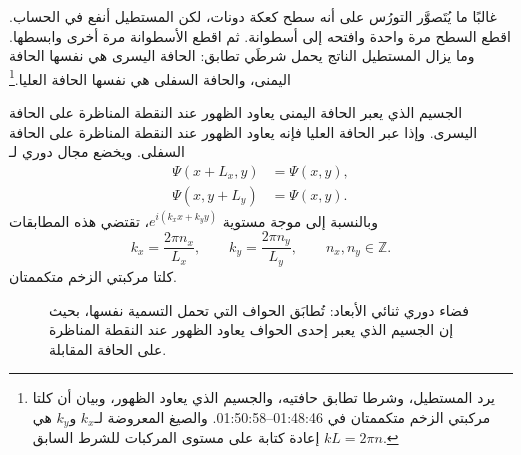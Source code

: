 \begin{classroomqa}
\end{classroomqa}

غالبًا ما يُتَصوَّر التورُس على أنه سطح كعكة دونات، لكن المستطيل أنفع في الحساب. اقطع السطح مرة واحدة وافتحه إلى أسطوانة. ثم اقطع الأسطوانة مرة أخرى وابسطها. وما يزال المستطيل الناتج يحمل شرطَي تطابق: الحافة اليسرى هي نفسها الحافة اليمنى، والحافة السفلى هي نفسها الحافة العليا.\footnote{يرد المستطيل، وشرطا تطابق حافتيه، والجسيم الذي يعاود الظهور، وبيان أن كلتا مركبتي الزخم متكممتان في 01:48:46--01:50:58. والصيغ المعروضة لـ\(k_x\) و\(k_y\) هي إعادة كتابة على مستوى المركبات للشرط السابق \(kL=2\pi n\).}

الجسيم الذي يعبر الحافة اليمنى يعاود الظهور عند النقطة المناظرة على الحافة اليسرى. وإذا عبر الحافة العليا فإنه يعاود الظهور عند النقطة المناظرة على الحافة السفلى. ويخضع مجال دوري لـ
\begin{align}
\Psi(x+L_x,y)&=\Psi(x,y),\\
\Psi(x,y+L_y)&=\Psi(x,y).
\end{align}
وبالنسبة إلى موجة مستوية \(e^{i(k_x x+k_y y)}\)، تقتضي هذه المطابقات
\begin{equation}
k_x=\frac{2\pi n_x}{L_x},
\qquad
k_y=\frac{2\pi n_y}{L_y},
\qquad
n_x,n_y\in\mathbb Z.
\end{equation}
كلتا مركبتي الزخم متكممتان.

\begin{figure}[t]
\centering
{}
\caption{فضاء دوري ثنائي الأبعاد: تُطابَق الحواف التي تحمل التسمية نفسها، بحيث إن الجسيم الذي يعبر إحدى الحواف يعاود الظهور عند النقطة المناظرة على الحافة المقابلة.}
\end{figure}

